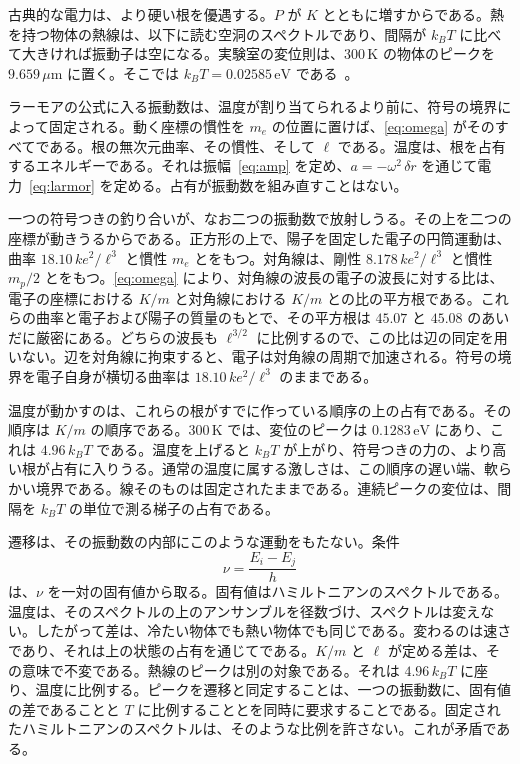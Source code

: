 \documentclass[a4paper]{article}
\begin{document}
古典的な電力は、より硬い根を優遇する。\(P\) が \(K\) とともに増すからである。熱を持つ物体の熱線は、以下に読む空洞のスペクトルであり、間隔が \(k_B T\) に比べて大きければ振動子は空になる。実験室の変位則は、\(300\,\mathrm{K}\) の物体のピークを \(9.659\,\mu\mathrm{m}\) に置く。そこでは \(k_B T=0.02585\,\mathrm{eV}\) である~\cite{codata2018}。

ラーモアの公式に入る振動数は、温度が割り当てられるより前に、符号の境界によって固定される。動く座標の慣性を \(m_e\) の位置に置けば、\eqref{eq:omega} がそのすべてである。根の無次元曲率、その慣性、そして \(\ell\) である。温度は、根を占有するエネルギーである。それは振幅~\eqref{eq:amp} を定め、\(a=-\omega^{2}\,\delta r\) を通じて電力~\eqref{eq:larmor} を定める。占有が振動数を組み直すことはない。

一つの符号つきの釣り合いが、なお二つの振動数で放射しうる。その上を二つの座標が動きうるからである。正方形の上で、陽子を固定した電子の円筒運動は、曲率 \(18.10\,k e^{2}/\ell^{3}\) と慣性 \(m_e\) とをもつ。対角線は、剛性 \(8.178\,k e^{2}/\ell^{3}\) と慣性 \(m_p/2\) とをもつ。\eqref{eq:omega} により、対角線の波長の電子の波長に対する比は、電子の座標における \(K/m\) と対角線における \(K/m\) との比の平方根である。これらの曲率と電子および陽子の質量のもとで、その平方根は \(45.07\) と \(45.08\) のあいだに厳密にある。どちらの波長も \(\ell^{3/2}\) に比例するので、この比は辺の同定を用いない。辺を対角線に拘束すると、電子は対角線の周期で加速される。符号の境界を電子自身が横切る曲率は \(18.10\,k e^{2}/\ell^{3}\) のままである。

温度が動かすのは、これらの根がすでに作っている順序の上の占有である。その順序は \(K/m\) の順序である。\(300\,\mathrm{K}\) では、変位のピークは \(0.1283\,\mathrm{eV}\) にあり、これは \(4.96\,k_B T\) である。温度を上げると \(k_B T\) が上がり、符号つきの力の、より高い根が占有に入りうる。通常の温度に属する激しさは、この順序の遅い端、軟らかい境界である。線そのものは固定されたままである。連続ピークの変位は、間隔を \(k_B T\) の単位で測る梯子の占有である。

遷移は、その振動数の内部にこのような運動をもたない。条件
\begin{equation}
\label{eq:bohrnu}
\nu=\frac{E_i-E_j}{h}
\end{equation}
は、\(\nu\) を一対の固有値から取る。固有値はハミルトニアンのスペクトルである。温度は、そのスペクトルの上のアンサンブルを径数づけ、スペクトルは変えない。したがって差は、冷たい物体でも熱い物体でも同じである。変わるのは速さであり、それは上の状態の占有を通じてである。\(K/m\) と \(\ell\) が定める差は、その意味で不変である。熱線のピークは別の対象である。それは \(4.96\,k_B T\) に座り、温度に比例する。ピークを遷移と同定することは、一つの振動数に、固有値の差であることと \(T\) に比例することとを同時に要求することである。固定されたハミルトニアンのスペクトルは、そのような比例を許さない。これが矛盾である。
\end{document}
